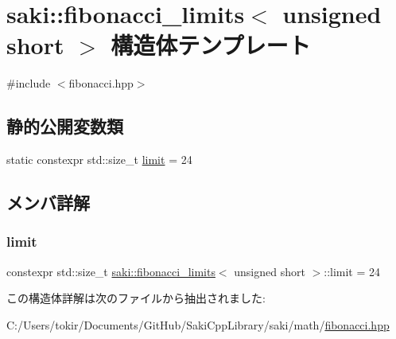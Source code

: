 \hypertarget{structsaki_1_1fibonacci__limits_3_01unsigned_01short_01_4}{}\section{saki\+:\+:fibonacci\+\_\+limits$<$ unsigned short $>$ 構造体テンプレート}
\label{structsaki_1_1fibonacci__limits_3_01unsigned_01short_01_4}


{\ttfamily \#include $<$fibonacci.\+hpp$>$}

\subsection*{静的公開変数類}
\begin{DoxyCompactItemize}
\item 
static constexpr std\+::size\+\_\+t \mbox{\hyperlink{structsaki_1_1fibonacci__limits_3_01unsigned_01short_01_4_aa1342abb593ad402e322c92de7964950}{limit}} = 24
\end{DoxyCompactItemize}


\subsection{メンバ詳解}
\mbox{\label{structsaki_1_1fibonacci__limits_3_01unsigned_01short_01_4_aa1342abb593ad402e322c92de7964950}} 
\subsubsection{\texorpdfstring{limit}{limit}}
{\footnotesize\ttfamily constexpr std\+::size\+\_\+t \mbox{\hyperlink{structsaki_1_1fibonacci__limits}{saki\+::fibonacci\+\_\+limits}}$<$ unsigned short $>$\+::limit = 24\hspace{0.3cm}{\ttfamily [static]}}



この構造体詳解は次のファイルから抽出されました\+:\begin{DoxyCompactItemize}
\item 
C\+:/\+Users/tokir/\+Documents/\+Git\+Hub/\+Saki\+Cpp\+Library/saki/math/\mbox{\hyperlink{fibonacci_8hpp}{fibonacci.\+hpp}}\end{DoxyCompactItemize}
